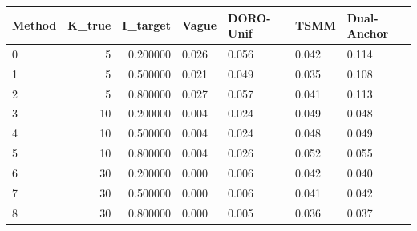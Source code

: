 \begin{tabular}{lrrllll}
\toprule
Method & K_true & I_target & Vague & DORO-Unif & TSMM & Dual-Anchor \\
\midrule
0 & 5 & 0.200000 & 0.026 & 0.056 & 0.042 & 0.114 \\
1 & 5 & 0.500000 & 0.021 & 0.049 & 0.035 & 0.108 \\
2 & 5 & 0.800000 & 0.027 & 0.057 & 0.041 & 0.113 \\
3 & 10 & 0.200000 & 0.004 & 0.024 & 0.049 & 0.048 \\
4 & 10 & 0.500000 & 0.004 & 0.024 & 0.048 & 0.049 \\
5 & 10 & 0.800000 & 0.004 & 0.026 & 0.052 & 0.055 \\
6 & 30 & 0.200000 & 0.000 & 0.006 & 0.042 & 0.040 \\
7 & 30 & 0.500000 & 0.000 & 0.006 & 0.041 & 0.042 \\
8 & 30 & 0.800000 & 0.000 & 0.005 & 0.036 & 0.037 \\
\bottomrule
\end{tabular}

